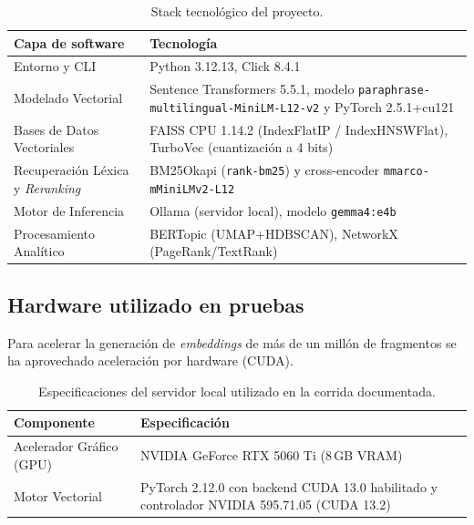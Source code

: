 \documentclass[11pt,a4paper]{article}
\newcommand{\code}[1]{\texttt{#1}}
\begin{document}
\begin{table}[htbp]
\centering
\small
{}
\begin{tabularx}{\textwidth}{l X}
\toprule
\rowcolor{tabheader} \textbf{Capa de software} & \textbf{Tecnología} \\
\midrule
Entorno y CLI & Python 3.12.13, Click 8.4.1 \\
Modelado Vectorial & Sentence Transformers 5.5.1, modelo \code{paraphrase-multilingual-MiniLM-L12-v2} y PyTorch 2.5.1+cu121 \\
Bases de Datos Vectoriales & FAISS CPU 1.14.2 (IndexFlatIP / IndexHNSWFlat), TurboVec (cuantización a 4 bits) \\
Recuperación Léxica y \textit{Reranking} & BM25Okapi (\code{rank-bm25}) y cross-encoder \code{mmarco-mMiniLMv2-L12} \\
Motor de Inferencia & Ollama (servidor local), modelo \code{gemma4:e4b} \\
Procesamiento Analítico & BERTopic (UMAP+HDBSCAN), NetworkX (PageRank/TextRank) \\
\bottomrule
\end{tabularx}
\caption{Stack tecnológico del proyecto.}
\end{table}

\subsection{Hardware utilizado en pruebas}

Para acelerar la generación de \textit{embeddings} de más de un millón de fragmentos se ha aprovechado aceleración por hardware (CUDA).

\begin{table}[htbp]
\centering
{}
\begin{tabularx}{\textwidth}{l X}
\toprule
\rowcolor{tabheader} \textbf{Componente} & \textbf{Especificación} \\
\midrule
Acelerador Gráfico (GPU) & NVIDIA GeForce RTX 5060 Ti (8\,GB VRAM) \\
Motor Vectorial & PyTorch 2.12.0 con backend CUDA 13.0 habilitado y controlador NVIDIA 595.71.05 (CUDA 13.2) \\
\bottomrule
\end{tabularx}
\caption{Especificaciones del servidor local utilizado en la corrida documentada.}
\end{table}

\FloatBarrier
\newpage
\end{document}
